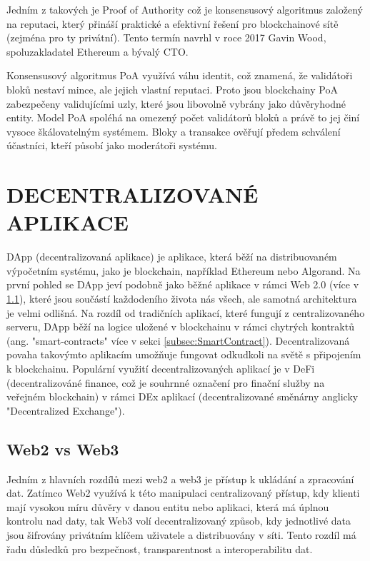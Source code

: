 Jedním z takových je Proof of Authority což je konsensusový algoritmus založený na reputaci, který přináší praktické a efektivní řešení pro blockchainové sítě (zejména pro ty privátní). Tento termín navrhl v roce 2017 Gavin Wood, spoluzakladatel Ethereum a bývalý CTO.

Konsensusový algoritmus PoA využívá váhu identit, což znamená, že validátoři bloků nestaví mince, ale jejich vlastní reputaci. Proto jsou blockchainy PoA zabezpečeny validujícími uzly, které jsou libovolně vybrány jako důvěryhodné entity. Model PoA spoléhá na omezený počet validátorů bloků a právě to jej činí vysoce škálovatelným systémem. Bloky a transakce ověřují předem schválení účastníci, kteří působí jako moderátoři systému. 	\cite{Konsensus}




\clearpage
\section{DECENTRALIZOVANÉ APLIKACE}


DApp (decentralizovaná aplikace) je aplikace, která běží na distribuovaném výpočetním systému, jako je blockchain, například Ethereum nebo Algorand. Na první pohled se DApp jeví podobně jako běžné aplikace v rámci Web 2.0 (více v \ref{subsec:Web2vsWeb3}), které jsou součástí každodeního života nás všech, ale samotná architektura je velmi odlišná. Na rozdíl od tradičních aplikací, které fungují z centralizovaného serveru, DApp běží na logice uložené v blockchainu v rámci chytrých kontraktů (ang. "smart-contracts"  více v sekci  \ref{subsec:SmartContract}). Decentralizovaná povaha takovýmto aplikacím umožňuje fungovat odkudkoli na světě s připojením k blockchainu. Populární využití decentralizovaných aplikací je v DeFi (decentralizováné finance, což je souhrnné označení pro finační služby na veřejném blockchain) v rámci DEx aplikací (decentralizované směnárny anglicky "Decentralized Exchange").	\cite{DApps}


\subsection{Web2 vs Web3}\label{subsec:Web2vsWeb3}

Jedním z hlavních rozdílů mezi web2 a web3 je přístup k ukládání a zpracování dat. Zatímco Web2 využívá k této manipulaci centralizovaný přístup, kdy klienti mají vysokou míru důvěry v danou entitu nebo aplikaci, která má úplnou kontrolu nad daty, tak Web3 volí decentralizovaný způsob, kdy jednotlivé data jsou šifrovány privátním klíčem uživatele a distribuovány v síti. Tento rozdíl má řadu důsledků pro bezpečnost, transparentnost a interoperabilitu dat.

